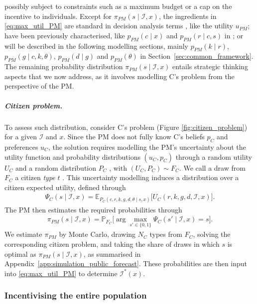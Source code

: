 \documentclass[12pt]{article}
\begin{document}
possibly subject to constraints such as a maximum budget or a cap on the incentive to individuals. Except for $\pi_{PM}(s \mid \mathcal{I}, x)$, the ingredients in \eqref{eq:max_util_PM} are standard in decision analysis terms \citep{french}, like the utility $u_{PM}$;  have been previously characterised, like $p_{PM}(c \mid x)$ and $p_{PM}(r \mid c,s)$ in \cite{corrales2024colorectal, corrales2025decision}; or will be described in the following modelling sections, mainly $p_{PM}(k \mid r)$, $p_{PM}(g \mid c,k,\theta)$, $p_{PM}(d \mid g)$ and $p_{PM}(\theta)$ in Section~\ref{sec:common_framework}. The remaining probability distribution $\pi_{PM}(s \mid \mathcal{I}, x)$ entails strategic thinking aspects that we now address, as it involves modelling C's problem from the perspective of the PM.

\subparagraph{Citizen problem.} To assess such distribution, consider C's problem (Figure \ref{fig:citizen_problem}) for a given $\mathcal{I}$ and $x$. Since the PM does not fully know C's beliefs $p_C$ and preferences $u_C$, the solution requires modelling the PM's uncertainty about the utility function and probability distributions $(u_{C}, p_{C})$ through a random utility $U_C$ and a random distribution $P_C$ \citep{rios2009adversarial}, with $(U_C, P_C) \sim F_C$. We call a draw from $F_C$ a citizen \emph{type} $t$ \citep{assaf2020bayesian}. This uncertainty modelling induces a distribution over a citizen expected utility, defined through 
\begin{align}\label{eq:randexp}
    \Psi_C (s \mid \mathcal{I} , x) = \mathbb{E}_{P_{C}(c,r,k,g,d,\theta \mid s, x)} \big[U_C(r,k,g,d,\mathcal{I},x) \big].
\end{align}
The PM then estimates the required probabilities through
\begin{align}\label{eq:probPM}
    \pi_{PM}(s \mid \mathcal{I}, x) = \mathbb{P}_{F_C}\big[\arg \max_{s' \in \{0,1\}} \Psi_C (s' \mid \mathcal{I} , x) = s\big].
\end{align}
We estimate $\pi_{PM}$ by Monte Carlo, drawing $N_C$ types from $F_C$, solving the corresponding citizen problem, and taking the share of draws in which $s$ is optimal as $\pi_{PM}(s \mid \mathcal{I}, x)$, as summarised in Appendix~\ref{app:simulation_public_forecast}. These probabilities are then input into \eqref{eq:max_util_PM} to determine $\mathcal{I}^*(x)$.



\subsubsection{Incentivising the entire population}\label{sec:incent}
\end{document}

